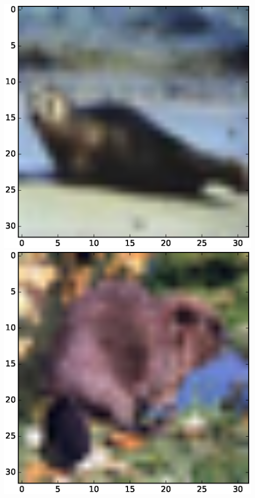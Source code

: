 \documentclass{article}
\begin{document}
\includegraphics[scale=.1]{fig/c8.eps}
\includegraphics[scale=.1]{fig/c10.eps}


 
\end{document}
